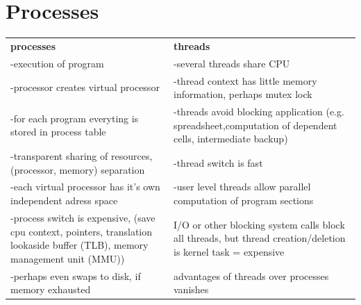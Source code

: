 \documentclass[ngerman,a4paper]{report}
\begin{document}
\section{Processes}
\begin{tabular}{p{7cm} p{7cm}}
\textbf{processes}			&\textbf{threads}\\
-execution of program			&-several threads share CPU\\
-processor creates virtual processor	&-thread context has little memory information, perhaps mutex lock\\
-for each program everyting is stored in process table	&-threads avoid blocking application (e.g. spreadsheet,computation of dependent cells, intermediate backup)\\
-transparent sharing of resources,(processor, memory) separation&-thread switch is fast\\
-each virtual processor has it's own independent adress space&-user level threads allow parallel computation of program sections\\
-process switch is expensive, (save cpu context, pointers, translation lookaside buffer (TLB), memory management unit (MMU))&I/O or other blocking system calls block all threads, but thread creation/deletion is kernel task = expensive \\
-perhaps even swaps to disk, if memory exhausted& advantages of threads over processes vanishes\\
\end{tabular}
\end{document}
